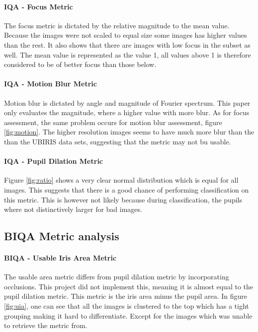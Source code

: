 \paragraph{IQA - Focus Metric}
The focus metric is dictated by the relative magnitude to the mean value.
Because the images were not scaled to equal size some images has higher values
than the rest.  It also shows that there are images with low focus in the subset
as well.  The mean value is represented as the value 1, all values above 1 is
therefore considered to be of better focus than those below.


\paragraph{IQA - Motion Blur Metric}
Motion blur is dictated by angle and magnitude of Fourier spectrum. This paper 
only evaluates the magnitude, where a higher value with more blur.
As for focus assessment, the same problem occurs for motion blur
assessment, figure \ref{fig:motion}.  The higher resolution images seems to have
much more blur than the than the UBIRIS data sets, suggesting  that the metric
may not bu usable.



\paragraph{IQA - Pupil Dilation Metric}
Figure \ref{fig:ratio} shows a very clear normal distribution which is equal
for all images.  This suggests that there is a good chance of performing
classification on this metric. This is however not likely because during
classification, the pupils where not distinctively larger for bad images.






\subsection{BIQA Metric analysis}
\paragraph{BIQA - Usable Iris Area Metric}
The usable area metric differs from pupil dilation metric by incorporating
occlusions. This project did not implement this, meaning it is almost equal to
the pupil dilation metric.  This metric is the iris area minus the pupil area.
In figure \ref{fig:uia}, one can see that all the images is clustered to the top
which has a tight grouping making it hard to differentiate. Except for the
images which was unable to retrieve the metric from.


